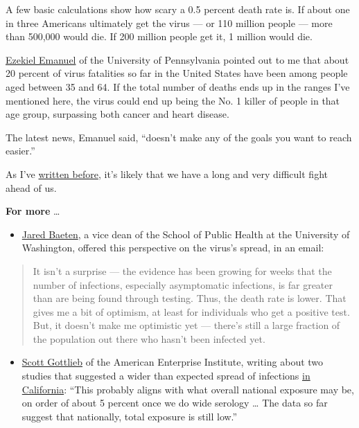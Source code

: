 A few basic calculations show how scary a 0.5 percent death rate is. If
about one in three Americans ultimately get the virus --- or 110 million
people --- more than 500,000 would die. If 200 million people get it, 1
million would die.

\href{https://www.nytimes3xbfgragh.onion/topic/person/ezekiel-j-emanuel}{Ezekiel
Emanuel} of the University of Pennsylvania pointed out to me that about
20 percent of virus fatalities so far in the United States have been
among people aged between 35 and 64. If the total number of deaths ends
up in the ranges I've mentioned here, the virus could end up being the
No. 1 killer of people in that age group, surpassing both cancer and
heart disease.

The latest news, Emanuel said, ``doesn't make any of the goals you want
to reach easier.''

As I've
\href{https://www.nytimes3xbfgragh.onion/2020/04/10/opinion/coronavirus-social-distancing.html}{written
before}, it's likely that we have a long and very difficult fight ahead
of us.

\textbf{For more} \ldots{}

\begin{itemize}
\tightlist
\item
  \href{https://globalhealth.washington.edu/faculty/jared-baeten}{Jared
  Baeten}, a vice dean of the School of Public Health at the University
  of Washington, offered this perspective on the virus's spread, in an
  email:
\end{itemize}

\begin{quote}
It isn't a surprise --- the evidence has been growing for weeks that the
number of infections, especially asymptomatic infections, is far greater
than are being found through testing. Thus, the death rate is lower.
That gives me a bit of optimism, at least for individuals who get a
positive test. But, it doesn't make me optimistic yet --- there's still
a large fraction of the population out there who hasn't been infected
yet.
\end{quote}

\begin{itemize}
\tightlist
\item
  \href{https://twitter.com/ScottGottliebMD/status/1251207647166160901}{Scott
  Gottlieb} of the American Enterprise Institute, writing about two
  studies that suggested a wider than expected spread of infections
  \href{https://www.nytimes3xbfgragh.onion/2020/04/21/health/coronavirus-antibodies-california.html}{in
  California}: ``This probably aligns with what overall national
  exposure may be, on order of about 5 percent once we do wide serology
  \ldots{} The data so far suggest that nationally, total exposure is
  still low.''
\end{itemize}

